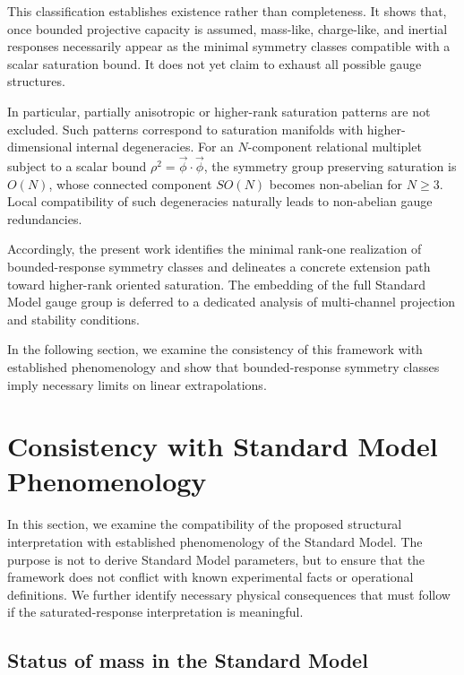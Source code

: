 \documentclass[pdflatex,sn-mathphys-num]{sn-jnl} %
\theoremstyle{remark}
\begin{document}
      This classification establishes existence rather than completeness.
      It shows that, once bounded projective capacity is assumed, mass-like, charge-like, and
      inertial responses necessarily appear as the minimal symmetry classes compatible with a
      scalar saturation bound.
      It does not yet claim to exhaust all possible gauge structures.

      In particular, partially anisotropic or higher-rank saturation patterns are not excluded.
      Such patterns correspond to saturation manifolds with higher-dimensional internal
      degeneracies.
      For an $N$-component relational multiplet subject to a scalar bound
      $\rho^2=\vec{\phi}\cdot\vec{\phi}$, the symmetry group preserving saturation is $O(N)$, whose
      connected component $SO(N)$ becomes non-abelian for $N\geq 3$.
      Local compatibility of such degeneracies naturally leads to non-abelian gauge redundancies.

      Accordingly, the present work identifies the minimal rank-one realization of bounded-response
      symmetry classes and delineates a concrete extension path toward higher-rank oriented
      saturation.
      The embedding of the full Standard Model gauge group is deferred to a dedicated analysis of
      multi-channel projection and stability conditions.

      In the following section, we examine the consistency of this framework with established
      phenomenology and show that bounded-response symmetry classes imply necessary limits on
      linear extrapolations.

  \section{Consistency with Standard Model Phenomenology}
    \label{sec:consistency}

    In this section, we examine the compatibility of the proposed structural
    interpretation with established phenomenology of the Standard Model.
    The purpose is not to derive Standard Model parameters, but to ensure that
    the framework does not conflict with known experimental facts or operational
    definitions.
    We further identify necessary physical consequences that must follow if the
    saturated-response interpretation is meaningful.

    \subsection{Status of mass in the Standard Model}
      \label{subsec:sm-mass}
\end{document}
